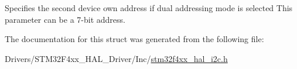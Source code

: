 Specifies the second device own address if dual addressing mode is selected This parameter can be a 7-\/bit address. 

The documentation for this struct was generated from the following file\+:\begin{DoxyCompactItemize}
\item 
Drivers/\+S\+T\+M32\+F4xx\+\_\+\+H\+A\+L\+\_\+\+Driver/\+Inc/\hyperlink{stm32f4xx__hal__i2c_8h}{stm32f4xx\+\_\+hal\+\_\+i2c.\+h}\end{DoxyCompactItemize}
